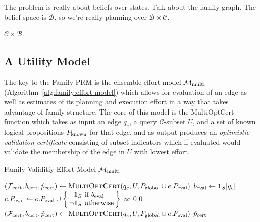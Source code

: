 The problem is really about beliefs over states.
Talk about the family graph.
The belief space is $\mathcal{B}$,
so we're really planning over $\mathcal{B} \times \mathcal{C}$.

$\mathcal{C} \times \mathcal{B}$.



\subsection{A Utility Model}

The key to the Family PRM is the ensemble effort model
$\mathcal{M}_{\mbox{\scriptsize multi}}$
(Algorithm~\ref{alg:family:effort-model})
which allows for evaluation of an edge
as well as estimates of its planning and execution effort
in a way that takes advantage of family structure.
The core of this model is the {\sc MultiOptCert} function
which takes as input an edge $q_e$,
a query $\mathcal{C}$-subset $U$,
and a set of known logical propositions $P_{\mbox{\scriptsize known}}$
for that edge,
and as output produces an \emph{optimistic validation certificate}
consisting of subset indicators which if evaluated would
validate the membership of the edge in $U$ with lowest effort.

\begin{algorithm}
\caption{Family Validitiy Effort Model
   $\mathcal{M}_{\mbox{\scriptsize multi}}$}
\label{alg:family:effort-model}
{\algrenewcommand\textproc{}%
\begin{algorithmic}[1]
   \State $(\mathcal{F}_{\mbox{\scriptsize cert}}, b_{\mbox{\scriptsize cert}}, {\hat p}_{\mbox{\scriptsize cert}})
      \leftarrow \mbox{\sc MultiOptCert}(q_e, U,
      P_{\mbox{\scriptsize global}} \cup e.P_{\mbox{\scriptsize eval}})$
      \State $b_{\mbox{\scriptsize eval}} \leftarrow \mathbf{1}_S[q_e]$
      \State $\arraycolsep=2pt
         e.P_{\ms{eval}} \leftarrow e.P_{\ms{eval}} \cup
         \left\{\begin{array}{rl}
         \mathbf{1}_S & \mbox{if } b_{\ms{eval}} \\
         \lnot \mathbf{1}_S & \mbox{otherwise} \\
         \end{array}
         \right\}$
         \State \Return $\infty$
      \EndIf
   \EndFor
   \State \Return $0$
\EndFunction
{}
   \State \Return $0$
\EndFunction
{}
   \State $(\mathcal{F}_{\mbox{\scriptsize cert}}, b_{\mbox{\scriptsize cert}}, {\hat p}_{\mbox{\scriptsize cert}})
      \leftarrow \mbox{\sc MultiOptCert}(q_e, U,
      P_{\mbox{\scriptsize global}} \cup e.P_{\mbox{\scriptsize eval}})$
   \State \Return ${\hat p}_{\mbox{\scriptsize cert}}$
\EndFunction
\end{algorithmic}
} %
\end{algorithm}

